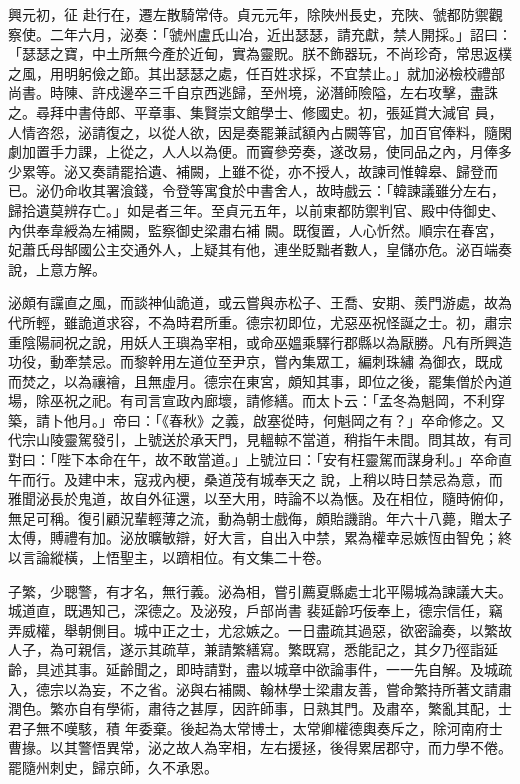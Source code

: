 \begin{pinyinscope}
 興元初，征
 赴行在，遷左散騎常侍。貞元元年，除陜州長史，充陜、虢都防禦觀察使。二年六月，泌奏：「虢州盧氏山冶，近出瑟瑟，請充獻，禁人開採。」詔曰：「瑟瑟之寶，中土所無今產於近甸，實為靈貺。朕不飾器玩，不尚珍奇，常思返樸之風，用明躬儉之節。其出瑟瑟之處，任百姓求採，不宜禁止。」就加泌檢校禮部尚書。時陳、許戍邊卒三千自京西逃歸，至州境，泌潛師險隘，左右攻擊，盡誅之。尋拜中書侍郎、平章事、集賢崇文館學士、修國史。初，張延賞大減官
 員，人情咨怨，泌請復之，以從人欲，因是奏罷兼試額內占闕等官，加百官俸料，隨閑劇加置手力課，上從之，人人以為便。而竇參旁奏，遂改易，使同品之內，月俸多少累等。泌又奏請罷拾遺、補闕，上雖不從，亦不授人，故諫司惟韓皋、歸登而已。泌仍命收其署湌錢，令登等寓食於中書舍人，故時戲云：「韓諫議雖分左右，歸拾遺莫辨存亡。」如是者三年。至貞元五年，以前東都防禦判官、殿中侍御史、內供奉韋綬為左補闕，監察御史梁肅右補
 闕。既復置，人心忻然。順宗在春宮，妃蕭氏母郜國公主交通外人，上疑其有他，連坐貶黜者數人，皇儲亦危。泌百端奏說，上意方解。



 泌頗有讜直之風，而談神仙詭道，或云嘗與赤松子、王喬、安期、羨門游處，故為代所輕，雖詭道求容，不為時君所重。德宗初即位，尤惡巫祝怪誕之士。初，肅宗重陰陽祠祝之說，用妖人王璵為宰相，或命巫媼乘驛行郡縣以為厭勝。凡有所興造功役，動牽禁忌。而黎幹用左道位至尹京，嘗內集眾工，編刺珠繡
 為御衣，既成而焚之，以為禳禬，且無虛月。德宗在東宮，頗知其事，即位之後，罷集僧於內道場，除巫祝之祀。有司言宣政內廊壞，請修繕。而太卜云：「孟冬為魁岡，不利穿築，請卜他月。」帝曰：「《春秋》之義，啟塞從時，何魁岡之有？」卒命修之。又代宗山陵靈駕發引，上號送於承天門，見轀輬不當道，稍指午未間。問其故，有司對曰：「陛下本命在午，故不敢當道。」上號泣曰：「安有枉靈駕而謀身利。」卒命直午而行。及建中末，寇戎內梗，桑道茂有城奉天之
 說，上稍以時日禁忌為意，而雅聞泌長於鬼道，故自外征還，以至大用，時論不以為愜。及在相位，隨時俯仰，無足可稱。復引顧況輩輕薄之流，動為朝士戲侮，頗貽譏誚。年六十八薨，贈太子太傅，賻禮有加。泌放曠敏辯，好大言，自出入中禁，累為權幸忌嫉恆由智免；終以言論縱橫，上悟聖主，以躋相位。有文集二十卷。



 子繁，少聰警，有才名，無行義。泌為相，嘗引薦夏縣處士北平陽城為諫議大夫。城道直，既遇知己，深德之。及泌歿，戶部尚書
 裴延齡巧佞奉上，德宗信任，竊弄威權，舉朝側目。城中正之士，尤忿嫉之。一日盡疏其過惡，欲密論奏，以繁故人子，為可親信，遂示其疏草，兼請繁繕寫。繁既寫，悉能記之，其夕乃徑詣延齡，具述其事。延齡聞之，即時請對，盡以城章中欲論事件，一一先自解。及城疏入，德宗以為妄，不之省。泌與右補闕、翰林學士梁肅友善，嘗命繁持所著文請肅潤色。繁亦自有學術，肅待之甚厚，因許師事，日熟其門。及肅卒，繁亂其配，士君子無不嘆駭，積
 年委棄。後起為太常博士，太常卿權德輿奏斥之，除河南府士曹掾。以其警悟異常，泌之故人為宰相，左右援拯，後得累居郡守，而力學不倦。罷隨州刺史，歸京師，久不承恩。




\end{pinyinscope}
